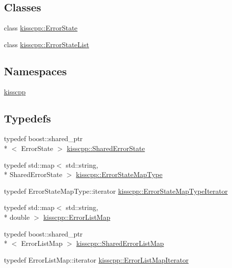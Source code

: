 \subsection*{Classes}
\begin{DoxyCompactItemize}
\item 
class \hyperlink{a00024}{kisscpp\-::\-Error\-State}
\item 
class \hyperlink{a00025}{kisscpp\-::\-Error\-State\-List}
\end{DoxyCompactItemize}
\subsection*{Namespaces}
\begin{DoxyCompactItemize}
\item 
\hyperlink{a00089}{kisscpp}
\end{DoxyCompactItemize}
\subsection*{Typedefs}
\begin{DoxyCompactItemize}
\item 
typedef boost\-::shared\-\_\-ptr\\*
$<$ Error\-State $>$ \hyperlink{a00089_af77de115307b379cbcab83a1fc54fdad}{kisscpp\-::\-Shared\-Error\-State}
\item 
typedef std\-::map$<$ std\-::string, \\*
Shared\-Error\-State $>$ \hyperlink{a00089_ab99725cc511536c050d9cab582313d0c}{kisscpp\-::\-Error\-State\-Map\-Type}
\item 
typedef Error\-State\-Map\-Type\-::iterator \hyperlink{a00089_a37b3f68e4626dc05d9d2381803a889b4}{kisscpp\-::\-Error\-State\-Map\-Type\-Iterator}
\item 
typedef std\-::map$<$ std\-::string, \\*
double $>$ \hyperlink{a00089_a325b559f17774bf1155d5dda8fe335e3}{kisscpp\-::\-Error\-List\-Map}
\item 
typedef boost\-::shared\-\_\-ptr\\*
$<$ Error\-List\-Map $>$ \hyperlink{a00089_a52b7a11959a119c1da931042d7751db0}{kisscpp\-::\-Shared\-Error\-List\-Map}
\item 
typedef Error\-List\-Map\-::iterator \hyperlink{a00089_a5493eddaf40e71c5f85672b1ab37afcb}{kisscpp\-::\-Error\-List\-Map\-Iterator}
\end{DoxyCompactItemize}
